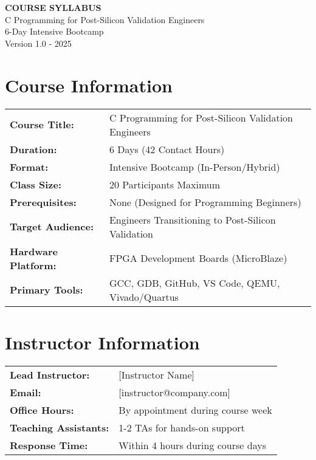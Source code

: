 \documentclass[11pt,a4paper]{article}
\begin{document}
\begin{center}
    {\Huge\bfseries\color{courseblue} COURSE SYLLABUS}\\[0.5cm]
    {\Large C Programming for Post-Silicon Validation Engineers}\\[0.3cm]
    {\large 6-Day Intensive Bootcamp}\\[0.2cm]
    {\normalsize Version 1.0 - 2025}
\end{center}

\vspace{1cm}

\section{Course Information}

\begin{tabular}{ll}
\textbf{Course Title:} & C Programming for Post-Silicon Validation Engineers \\
\textbf{Duration:} & 6 Days (42 Contact Hours) \\
\textbf{Format:} & Intensive Bootcamp (In-Person/Hybrid) \\
\textbf{Class Size:} & 20 Participants Maximum \\
\textbf{Prerequisites:} & None (Designed for Programming Beginners) \\
\textbf{Target Audience:} & Engineers Transitioning to Post-Silicon Validation \\
\textbf{Hardware Platform:} & FPGA Development Boards (MicroBlaze) \\
\textbf{Primary Tools:} & GCC, GDB, GitHub, VS Code, QEMU, Vivado/Quartus \\
\end{tabular}

\section{Instructor Information}

\begin{tabular}{ll}
\textbf{Lead Instructor:} & [Instructor Name] \\
\textbf{Email:} & [instructor@company.com] \\
\textbf{Office Hours:} & By appointment during course week \\
\textbf{Teaching Assistants:} & 1-2 TAs for hands-on support \\
\textbf{Response Time:} & Within 4 hours during course days \\
\end{tabular}
\end{document}
